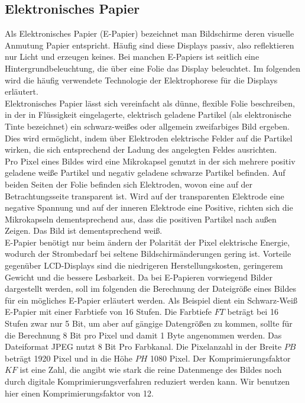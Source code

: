 \subsection{Elektronisches Papier}
Als Elektronisches Papier (E-Papier) bezeichnet man Bildschirme deren visuelle Anmutung Papier entspricht. Häufig sind diese Displays passiv, also reflektieren nur Licht und erzeugen keines. Bei manchen E-Papiers ist seitlich eine Hintergrundbeleuchtung, die über eine Folie das Display beleuchtet. Im folgenden wird die häufig verwendete Technologie der Elektrophorese für die Displays erläutert. \\
\glqq Elektronisches Papier lässt sich vereinfacht als dünne, flexible Folie beschreiben, in der in Flüssigkeit eingelagerte, elektrisch geladene Partikel (als elektronische Tinte bezeichnet) ein schwarz-weißes oder allgemein zweifarbiges Bild ergeben. Dies wird ermöglicht, indem über Elektroden elektrische Felder auf die Partikel wirken, die sich entsprechend der Ladung des angelegten Feldes ausrichten. \grqq \cite[Seite 568]{Schryen.2002} \\
Pro Pixel eines Bildes wird eine Mikrokapsel genutzt in der sich mehrere positiv geladene weiße Partikel und negativ geladene schwarze Partikel befinden. Auf beiden Seiten der Folie befinden sich Elektroden, wovon eine auf der Betrachtungsseite transparent ist. Wird auf der transparenten Elektrode eine negative Spannung und auf der inneren Elektrode eine Positive, richten sich die Mikrokapseln dementsprechend aus, dass die positiven Partikel nach außen Zeigen. Das Bild ist dementsprechend weiß. \cite[Vgl. Seite 567 f.]{Schryen.2002} \\
E-Papier benötigt nur beim ändern der Polarität der Pixel elektrische Energie, wodurch der Strombedarf bei seltene Bildschirmänderungen gering ist.
Vorteile gegenüber LCD-Displays sind die niedrigeren Herstellungskosten, geringerem Gewicht und die bessere Lesbarkeit. \cite[Vgl. Seite 569]{Schryen.2002}
Da bei E-Papieren vorwiegend Bilder dargestellt werden, soll im folgenden die Berechnung der Dateigröße eines Bildes für ein mögliches E-Papier erläutert werden.
Als Beispiel dient ein Schwarz-Weiß E-Papier mit einer Farbtiefe von 16 Stufen. Die Farbtiefe $ FT $ beträgt bei 16 Stufen zwar nur 5 Bit, um aber auf gängige Datengrößen zu kommen, sollte für die Berechnung 8 Bit pro Pixel und damit 1 Byte angenommen werden. Das Dateiformat JPEG  nutzt 8 Bit Pro Farbkanal. Die Pixelanzahl in der Breite $ PB $ beträgt 1920 Pixel und in die Höhe $ PH $ 1080 Pixel. Der Komprimierungsfaktor $ KF $ ist eine Zahl, die angibt wie stark die reine Datenmenge des Bildes noch durch digitale Komprimierungsverfahren reduziert werden kann. Wir benutzen hier einen Komprimierungsfaktor von 12. \cite[Vgl. Seite 22]{Buhler.2018}
